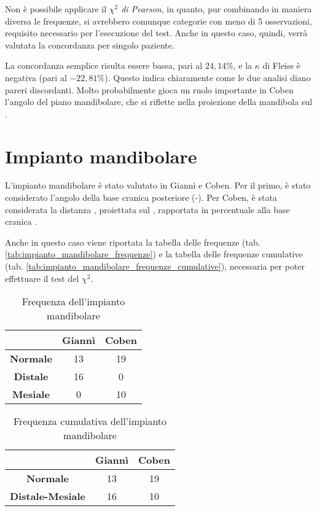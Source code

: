 Non è possibile applicare il \emph{$\chi^2$ di Pearson}, in quanto, pur combinando in maniera diversa le frequenze, si avrebbero comunque categorie con meno di 5 osservazioni, requisito necessario per l'esecuzione del test. Anche in questo caso, quindi, verrà valutata la concordanza per singolo paziente.

La concordanza semplice risulta essere bassa, pari al $24,14\%$, e la $\kappa$ di Fleiss è negativa (pari al $-22,81\%$). Questo indica chiaramente come le due analisi diano pareri discordanti. Molto probabilmente gioca un ruolo importante in Coben l'angolo del piano mandibolare, che si riflette nella proiezione della mandibola sul .

\section{Impianto mandibolare}
L'impianto mandibolare è stato valutato in Giannì e Coben. Per il primo, è stato considerato l'angolo della base cranica posteriore (-). Per Coben, è stata considerata la distanza , proiettata sul , rapportata in percentuale alla base cranica .

Anche in questo caso viene riportata la tabella delle frequenze (tab. \vref{tab:impianto_mandibolare_frequenze}) e la tabella delle frequenze cumulative (tab. \vref{tab:impianto_mandibolare_frequenze_cumulative}), necessaria per poter effettuare il test del $\chi^2$.

\begin{table}[ht]
\centering
\caption{Frequenza dell'impianto mandibolare}
\label{tab:impianto_mandibolare_frequenze}
\begin{tabular}{>{\bfseries}ccc}
\toprule
 & \textbf{Giannì} & \textbf{Coben} \\
\midrule
Normale & 13 & 19 \\
Distale & 16 & 0 \\
Mesiale & 0 & 10 \\
\bottomrule
\end{tabular}
\end{table}

\begin{table}[ht]
\centering
\caption{Frequenza cumulativa dell'impianto mandibolare}
\label{tab:impianto_mandibolare_frequenze_cumulative}
\begin{tabular}{>{\bfseries}ccc}
\toprule
 & \textbf{Giannì} & \textbf{Coben} \\
\midrule
Normale & 13 & 19 \\
Distale-Mesiale & 16 & 10 \\
\bottomrule
\end{tabular}
\end{table}


